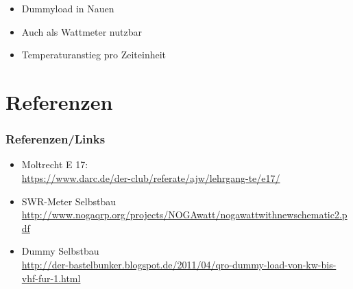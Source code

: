 \begin{frame}
\begin{minipage}{0.4\textwidth}
\begin{center}
\begin{figure}
      \end{figure}
    \end{center}
  \end{minipage}
  \begin{minipage}{0.55\textwidth}
    \begin{itemize}
      \item Dummyload in Nauen
      \item Auch als Wattmeter nutzbar
      \item Temperaturanstieg pro Zeiteinheit
    \end{itemize}
  \end{minipage}
\end{frame}

\section*{Referenzen}

\begin{frame}
  \frametitle{Referenzen/Links}

  \footnotesize
  \begin{itemize}
    \item Moltrecht E 17: \\
      \url{https://www.darc.de/der-club/referate/ajw/lehrgang-te/e17/}
    \item SWR-Meter Selbstbau \\
      \url{http://www.nogaqrp.org/projects/NOGAwatt/nogawattwithnewschematic2.pdf}
    \item Dummy Selbstbau \\
      \url{http://der-bastelbunker.blogspot.de/2011/04/qro-dummy-load-von-kw-bis-vhf-fur-1.html}
  \end{itemize}

\end{frame}


